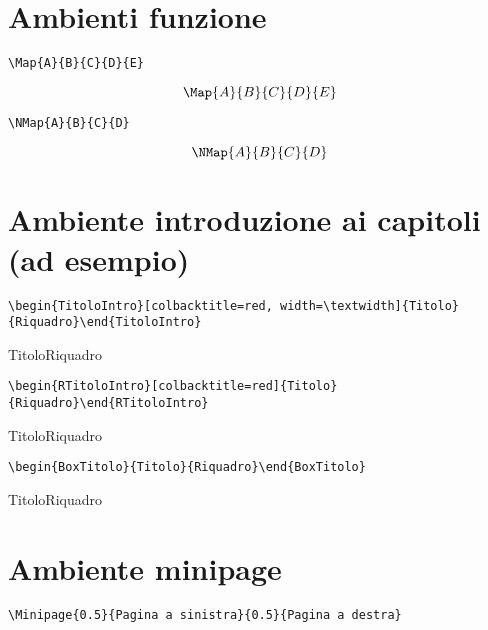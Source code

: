 \section{Ambienti funzione}	
\begin{verbatim}
\Map{A}{B}{C}{D}{E}
\end{verbatim}
$$\Map{A}{B}{C}{D}{E}$$

\begin{verbatim}
\NMap{A}{B}{C}{D}
\end{verbatim}
$$\NMap{A}{B}{C}{D}$$
\section{Ambiente introduzione ai capitoli (ad esempio)}
\begin{verbatim}
\begin{TitoloIntro}[colbacktitle=red, width=\textwidth]{Titolo}{Riquadro}\end{TitoloIntro}
\end{verbatim}
\begin{TitoloIntro}[colbacktitle=red, width=\textwidth]{Titolo}{Riquadro}\end{TitoloIntro}

\begin{verbatim}
\begin{RTitoloIntro}[colbacktitle=red]{Titolo}{Riquadro}\end{RTitoloIntro}
\end{verbatim}
\begin{RTitoloIntro}[colbacktitle=red]{Titolo}{Riquadro}\end{RTitoloIntro}

\begin{verbatim}
\begin{BoxTitolo}{Titolo}{Riquadro}\end{BoxTitolo}
\end{verbatim}
\begin{BoxTitolo}{Titolo}{Riquadro}\end{BoxTitolo}
\section{Ambiente minipage}
\begin{verbatim}
\Minipage{0.5}{Pagina a sinistra}{0.5}{Pagina a destra}
\end{verbatim}
